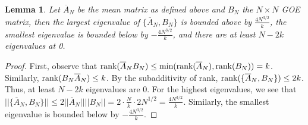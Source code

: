 \documentclass[11pt,reqno]{amsart}
\numberwithin{equation}{section}
\theoremstyle{plain}
\newtheorem{lemma}[thm]{Lemma}
\begin{document}
\begin{lemma}
Let $\overline{A}_N$ be the mean matrix as defined above and $B_N$ the $N\times N$ GOE matrix, then the largest eigenvalue of $\{\overline{A}_N, B_N\}$ is bounded above by $\frac{4N^{3/2}}{k}$, the smallest eigenvalue is bounded below by $-\frac{4N^{3/2}}{k}$, and there are at least $N-2k$ eigenvalues at 0.
\end{lemma}

\begin{proof}
First, observe that $\textup{rank}(\overline{A}_N B_N)\leq \textup{min}(\textup{rank}(\overline{A}_N), \textup{rank}(B_N))=k$. Similarly, $\textup{rank}(B_N\overline{A}_N)\leq k$. By the subadditivity of rank, $\textup{rank}(\{\overline{A}_N, B_N\})\leq 2k$. Thus, at least $N-2k$ eigenvalues are $0$. For the highest eigenvalues, we see that $||\{\overline{A}_N, B_N\}||\leq 2||\overline{A}_N||||B_N||=2\cdot \frac{N}{k}\cdot 2N^{1/2}=\frac{4N^{3/2}}{k}$. Similarly, the smallest eigenvalue is bounded below by $-\frac{4N^{3/2}}{k}$.
\end{proof}
\end{document}
